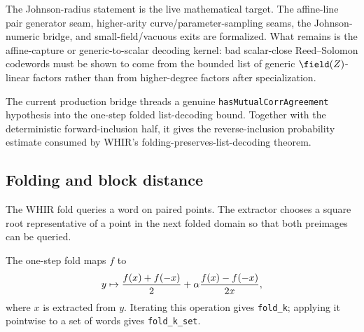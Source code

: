 \begin{remark}\label{rem:whir_mca_status}
    The Johnson-radius statement is the live mathematical target.  The affine-line pair
    generator seam, higher-arity curve/parameter-sampling seams, the Johnson-numeric bridge,
    and small-field/vacuous exits are formalized.  What remains is the affine-capture or
    generic-to-scalar decoding kernel: bad scalar-close Reed--Solomon codewords must be shown
    to come from the bounded list of generic $\field(Z)$-linear factors rather than from
    higher-degree factors after specialization.
\end{remark}

\begin{lemma}\label{lem:whir_mca_list_decoding}
    The current production bridge threads a genuine \texttt{hasMutualCorrAgreement}
    hypothesis into the one-step folded list-decoding bound.  Together with the deterministic
    forward-inclusion half, it gives the reverse-inclusion probability estimate consumed by
    WHIR's folding-preserves-list-decoding theorem.
\end{lemma}

\subsection{Folding and block distance}\label{sec:whir_folding}

\begin{definition}\label{def:whir_extract}
    The WHIR fold queries a word on paired points.  The extractor chooses a square root
    representative of a point in the next folded domain so that both preimages can be queried.
\end{definition}

\begin{definition}\label{def:whir_folding}
    The one-step fold maps $f$ to
    \[
        y \mapsto {f(x)+f(-x)\over 2}
        + \alpha {f(x)-f(-x)\over 2x},
    \]
    where $x$ is extracted from $y$.  Iterating this operation gives \texttt{fold\_k};
    applying it pointwise to a set of words gives \texttt{fold\_k\_set}.
\end{definition}

